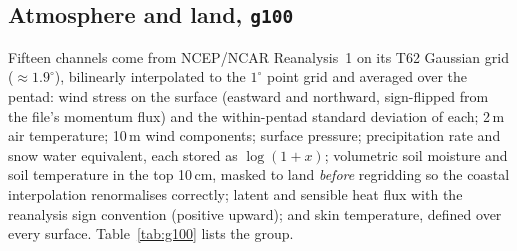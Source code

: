 \documentclass[10pt]{article}
\newcommand{\code}[1]{\texttt{#1}}
\begin{document}
\subsection{Atmosphere and land, \code{g100}}

Fifteen channels come from NCEP/NCAR Reanalysis~1 \cite{ncep} on its T62
Gaussian grid ($\approx1.9^\circ$), bilinearly interpolated to the $1^\circ$
point grid and averaged over the pentad: wind stress on the surface
(eastward and northward, sign-flipped from the file's momentum flux) and the
within-pentad standard deviation of each; 2\,m air temperature; 10\,m wind
components; surface pressure; precipitation rate and snow water equivalent,
each stored as $\log(1+x)$; volumetric soil moisture and soil temperature in
the top 10\,cm, masked to land \emph{before} regridding so the coastal
interpolation renormalises correctly; latent and sensible heat flux with the
reanalysis sign convention (positive upward); and skin temperature, defined
over every surface. Table~\ref{tab:g100} lists the group.
\end{document}
